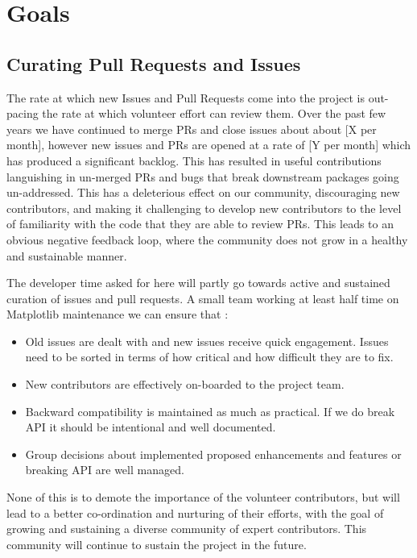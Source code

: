 \documentclass[11pt]{article}  %
\begin{document}
\section{Goals}
\subsection{Curating Pull Requests and Issues}

The rate at which new Issues and Pull Requests come into the project
is out-pacing the rate at which volunteer effort can review them.
Over the past few years we have continued to merge PRs and close
issues about about [X per month], however new issues and PRs are opened
at a rate of [Y per month] which has produced a significant backlog.
This has resulted in useful contributions languishing in un-merged PRs
and bugs that break downstream packages going un-addressed.  This has
a deleterious effect on our community, discouraging new contributors,
and making it challenging to develop new contributors to the level of
familiarity with the code that they are able to review PRs. This leads
to an obvious negative feedback loop, where the community does not
grow in a healthy and sustainable manner.

The developer time asked for here will partly go towards active and
sustained curation of issues and pull requests.  A small team working
at least half time on Matplotlib maintenance we can ensure that :

\begin{itemize}
\item Old issues are dealt with and new issues receive quick
  engagement.  Issues need to be sorted in terms of how critical
  and how difficult they are to fix.
\item New contributors are effectively on-boarded to the project team.
\item Backward compatibility is maintained as much as practical.  If
  we do break API it should be intentional and well documented.
\item Group decisions about implemented proposed enhancements and features
  or breaking API are well managed.
\end{itemize}

None of this is to demote the importance of the volunteer
contributors, but will lead to a better co-ordination and nurturing of
their efforts, with the goal of growing and sustaining a diverse
community of expert contributors.  This community will continue to
sustain the project in the future.
\end{document}
